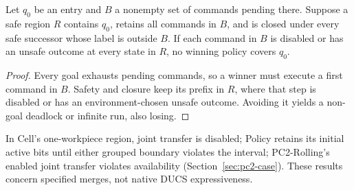 \begin{lemma}
\label{lem:mandatory-obstruction}
Let $q_0$ be an entry and $B$ a nonempty set of commands pending there. Suppose a safe region $R$ contains $q_0$, retains all commands in $B$, and is closed under every safe successor whose label is outside $B$. If each command in $B$ is disabled or has an unsafe outcome at every state in $R$, no winning policy covers $q_0$.
\end{lemma}
\begin{proof}
Every goal exhausts pending commands, so a winner must execute a first command in $B$. Safety and closure keep its prefix in $R$, where that step is disabled or has an environment-chosen unsafe outcome. Avoiding it yields a non-goal deadlock or infinite run, also losing.
\end{proof}
In Cell's one-workpiece region, joint transfer is disabled; Policy retains its initial active bits until either grouped boundary violates the interval; PC2-Rolling's enabled joint transfer violates availability (Section~\ref{sec:pc2-case}). These results concern specified merges, not native DUCS expressiveness.
